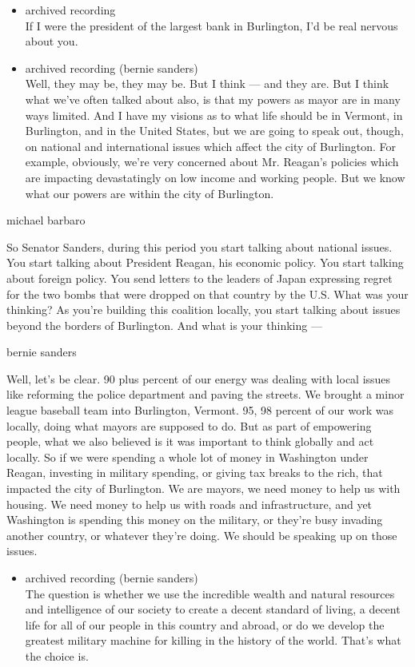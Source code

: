 \begin{itemize}
\item
  archived recording\\
  If I were the president of the largest bank in Burlington, I'd be real
  nervous about you.
\item
  archived recording (bernie sanders)\\
  Well, they may be, they may be. But I think --- and they are. But I
  think what we've often talked about also, is that my powers as mayor
  are in many ways limited. And I have my visions as to what life should
  be in Vermont, in Burlington, and in the United States, but we are
  going to speak out, though, on national and international issues which
  affect the city of Burlington. For example, obviously, we're very
  concerned about Mr. Reagan's policies which are impacting
  devastatingly on low income and working people. But we know what our
  powers are within the city of Burlington.
\end{itemize}

michael barbaro

So Senator Sanders, during this period you start talking about national
issues. You start talking about President Reagan, his economic policy.
You start talking about foreign policy. You send letters to the leaders
of Japan expressing regret for the two bombs that were dropped on that
country by the U.S. What was your thinking? As you're building this
coalition locally, you start talking about issues beyond the borders of
Burlington. And what is your thinking ---

bernie sanders

Well, let's be clear. 90 plus percent of our energy was dealing with
local issues like reforming the police department and paving the
streets. We brought a minor league baseball team into Burlington,
Vermont. 95, 98 percent of our work was locally, doing what mayors are
supposed to do. But as part of empowering people, what we also believed
is it was important to think globally and act locally. So if we were
spending a whole lot of money in Washington under Reagan, investing in
military spending, or giving tax breaks to the rich, that impacted the
city of Burlington. We are mayors, we need money to help us with
housing. We need money to help us with roads and infrastructure, and yet
Washington is spending this money on the military, or they're busy
invading another country, or whatever they're doing. We should be
speaking up on those issues.

\begin{itemize}
\tightlist
\item
  archived recording (bernie sanders)\\
  The question is whether we use the incredible wealth and natural
  resources and intelligence of our society to create a decent standard
  of living, a decent life for all of our people in this country and
  abroad, or do we develop the greatest military machine for killing in
  the history of the world. That's what the choice is.
\end{itemize}

